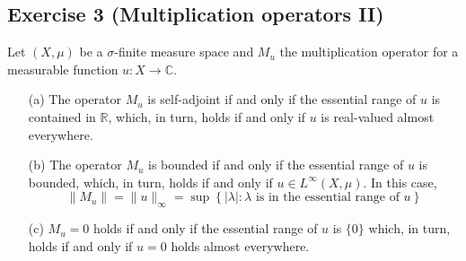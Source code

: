 \subsection{Exercise 3 (Multiplication operators II)}

Let $(X,\mu)$ be a $\sigma$-finite measure space and $M_{u}$ the multiplication operator for a measurable function $u:X\to\mathbb{C}$.
\begin{itemize}
	\item [(a)]
		The operator $M_{u}$ is self-adjoint if and only if the essential range of $u$ is contained in $\mathbb{R}$, which, in turn, holds if and only if $u$ is real-valued almost everywhere.
	\item [(b)]
		The operator $M_{u}$ is bounded if and only if the essential range of $u$ is bounded, which, in turn, holds if and only if $u\in L^{\infty}(X,\mu)$. In this case,
		\begin{equation*}
			\|M_{u}\| = \|u\|_{\infty} = \sup\left\{|\lambda|\colon \lambda \text{ is in the essential range of }u\right\}
		\end{equation*}
	\item [(c)]
		$M_{u}=0$ holds if and only if the essential range of $u$ is $\{0\}$ which, in turn, holds if and only if $u=0$ holds almost everywhere.
\end{itemize}

